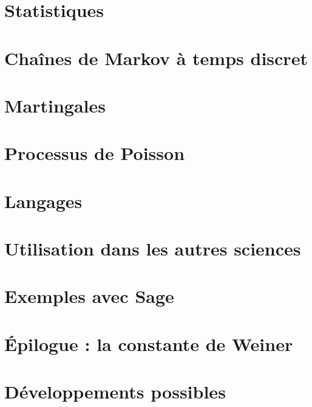 \documentclass[a4paper,twoside,11pt]{book}
\begin{document}
\chapter{Statistiques}


\chapter{Chaînes de Markov à temps discret}


\chapter{Martingales}


\chapter{Processus de Poisson}


\chapter{Langages}


\chapter{Utilisation dans les autres sciences}



\chapter{Exemples avec Sage}


\chapter{Épilogue : la constante de Weiner}



\chapter{Développements possibles}



\emptyInputPath
{}
\end{document}
